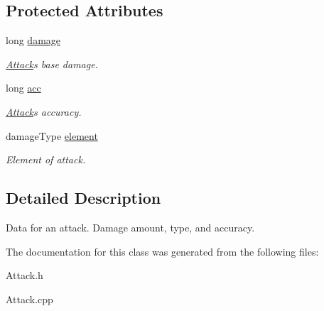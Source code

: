 \subsection*{Protected Attributes}
\begin{DoxyCompactItemize}
\item 
long \hyperlink{class_attack_adabef93e40cf94f3dac58532b3fddac2}{damage}\hypertarget{class_attack_adabef93e40cf94f3dac58532b3fddac2}{}\label{class_attack_adabef93e40cf94f3dac58532b3fddac2}

\begin{DoxyCompactList}\small\item\em \hyperlink{class_attack}{Attack}\textquotesingle{}s base damage. \end{DoxyCompactList}\item 
long \hyperlink{class_attack_aa109887bd6e479de6c01bb6fd3128e10}{acc}\hypertarget{class_attack_aa109887bd6e479de6c01bb6fd3128e10}{}\label{class_attack_aa109887bd6e479de6c01bb6fd3128e10}

\begin{DoxyCompactList}\small\item\em \hyperlink{class_attack}{Attack}\textquotesingle{}s accuracy. \end{DoxyCompactList}\item 
damage\+Type \hyperlink{class_attack_a0910777fac28d0a017e5ab7d976984fb}{element}\hypertarget{class_attack_a0910777fac28d0a017e5ab7d976984fb}{}\label{class_attack_a0910777fac28d0a017e5ab7d976984fb}

\begin{DoxyCompactList}\small\item\em Element of attack. \end{DoxyCompactList}\end{DoxyCompactItemize}


\subsection{Detailed Description}
Data for an attack. Damage amount, type, and accuracy. 

The documentation for this class was generated from the following files\+:\begin{DoxyCompactItemize}
\item 
Attack.\+h\item 
Attack.\+cpp\end{DoxyCompactItemize}
